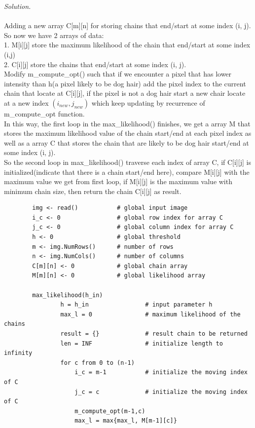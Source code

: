 \documentclass[10pt]{article}
\begin{document}
\begin{enumerate}
    \begin{mdframed}
        \textit{Solution.}\\
        \\Adding a new array C[m][n] for storing chains that end/start at some index (i, j).
        \\So now we have 2 arrays of data: 
        \\1. M[i][j] store the maximum likelihood of the chain that end/start at some index (i,j)
        \\2. C[i][j] store the chains that end/start at some index (i, j).
        \\Modify m\_compute\_opt() such that if we encounter a pixel that has lower intensity than h(a pixel likely to be dog hair) add the pixel index to the current chain that locate at C[i][j], if the pixel is not a dog hair start a new chair locate at a new index $(i_{new}, j_{new})$ which keep updating by recurrence of m\_compute\_opt function.
        \\In this way, the first loop in the max\_likelihood() finishes, we get a array M that stores the maximum likelihood value of the chain start/end at each pixel index as well as a array C that stores the chain that are likely to be dog hair start/end at some index (i, j).
        \\So the second loop in max\_likelihood() traverse each index of array C, if C[i][j] is initialized(indicate that there is a chain start/end here), compare M[i][j] with the maximum value we get from first loop, if M[i][j] is the maximum value with minimum chain size, then return the chain C[i][j] as result.
        
        \begin{lstlisting}
        img <- read()           # global input image
        i_c <- 0                # global row index for array C
        j_c <- 0                # global column index for array C
        h <- 0                  # global threshold
        m <- img.NumRows()      # number of rows
        n <- img.NumCols()      # number of columns
        C[m][n] <- 0            # global chain array
        M[m][n] <- 0            # global likelihood array
        
        max_likelihood(h_in)
                h = h_in                # input parameter h
                max_l = 0               # maximum likelihood of the chains
                result = {}             # result chain to be returned
                len = INF               # initialize length to infinity
                for c from 0 to (n-1)
                    i_c = m-1           # initialize the moving index of C   
                    j_c = c             # initialize the moving index of C
                    m_compute_opt(m-1,c)
                    max_l = max{max_l, M[m-1][c]}
                

\end{lstlisting}
\end{mdframed}
\end{enumerate}
\end{document}
